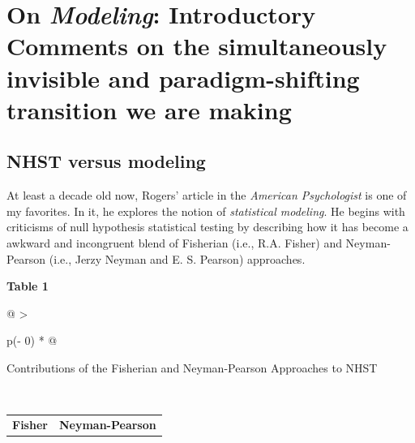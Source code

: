 \documentclass[
  11pt,
]{book}
\begin{document}
\hypertarget{on-modeling-introductory-comments-on-the-simultaneously-invisible-and-paradigm-shifting-transition-we-are-making}{%
\section{\texorpdfstring{On \emph{Modeling}: Introductory Comments on the simultaneously invisible and paradigm-shifting transition we are making}{On Modeling: Introductory Comments on the simultaneously invisible and paradigm-shifting transition we are making}}\label{on-modeling-introductory-comments-on-the-simultaneously-invisible-and-paradigm-shifting-transition-we-are-making}}

\hypertarget{nhst-versus-modeling}{%
\subsection{NHST versus modeling}\label{nhst-versus-modeling}}

At least a decade old now, Rogers' \citeyearpar{rodgers_epistemology_2010} article in the \emph{American Psychologist} is one of my favorites. In it, he explores the notion of \emph{statistical modeling}. He begins with criticisms of null hypothesis statistical testing by describing how it has become a awkward and incongruent blend of Fisherian (i.e., R.A. Fisher) and Neyman-Pearson (i.e., Jerzy Neyman and E. S. Pearson) approaches.

\textbf{Table 1}

\begin{longtable}[]{@{}
  >{\raggedright\arraybackslash}p{(\columnwidth - 0\tabcolsep) * }@{}}
\toprule\noalign{}
\begin{minipage}[b]{\linewidth}\raggedright
Contributions of the Fisherian and Neyman-Pearson Approaches to NHST \citep{rodgers_epistemology_2010}
\end{minipage} \\
\midrule\noalign{}
\endhead
\bottomrule\noalign{}
\endlastfoot
\end{longtable}

\begin{longtable}[]{@{}
  >{\centering\arraybackslash}p{}
  >{\centering\arraybackslash}p{}@{}}
\toprule\noalign{}
\endhead
\bottomrule\noalign{}
\endlastfoot
\textbf{Fisher} & \textbf{Neyman-Pearson} \\
\end{longtable}
\end{document}

